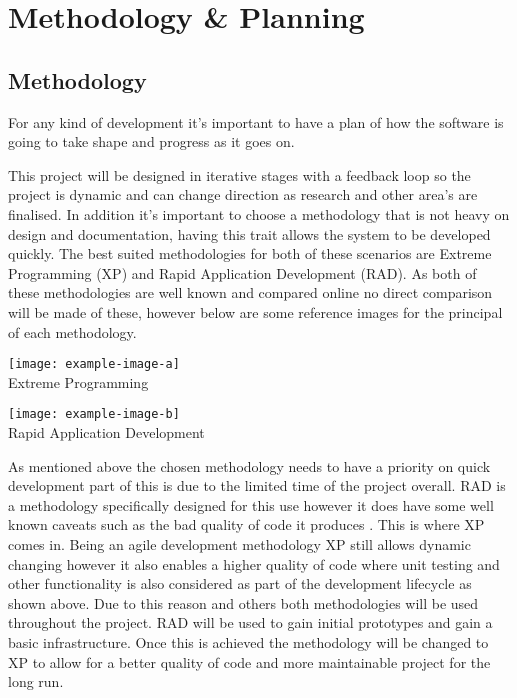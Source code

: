 \section{Methodology \& Planning}
\subsection{Methodology}
For any kind of development it's important to have a plan of how the software is going to take shape and progress as it goes on. 

This project will be designed in iterative stages with a feedback loop so the project is dynamic and can change direction as research and other area's are finalised. In addition it's important to choose a methodology that is not heavy on design and documentation, having this trait allows the system to be developed quickly. The best suited methodologies for both of these scenarios are Extreme Programming (XP) and Rapid Application Development (RAD). As both of these methodologies are well known and compared online no direct comparison will be made of these, however below are some reference images for the principal of each methodology.

\begin{center}
	\texttt{[image: example-image-a]}\\
	Extreme Programming
\end{center}

\begin{center}
	\texttt{[image: example-image-b]}\\
	Rapid Application Development
\end{center}

As mentioned above the chosen methodology needs to have a priority on quick development part of this is due to the limited time of the project overall. RAD is a methodology specifically designed for this use however it does have some well known caveats such as the bad quality of code it produces \citetemp. This is where XP comes in. Being an agile development methodology XP still allows dynamic changing however it also enables a higher quality of code where unit testing and other functionality is also considered as part of the development lifecycle as shown above. Due to this reason and others both methodologies will be used throughout the project. RAD will be used to gain initial prototypes and gain a basic infrastructure. Once this is achieved the methodology will be changed to XP to allow for a better quality of code and more maintainable project for the long run.\\

